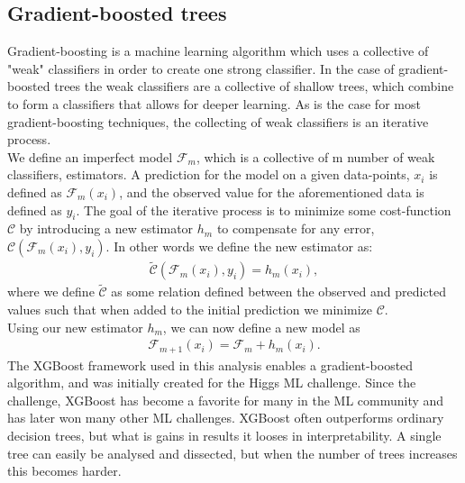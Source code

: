 \documentclass{article}
\begin{document}
\subsection{Gradient-boosted trees \cite{HIGGS}}
Gradient-boosting is a machine learning algorithm which uses a collective of "weak" classifiers in order to create one strong classifier. In the case of gradient-boosted trees the weak classifiers are a collective of shallow trees, which combine to form a classifiers that allows for deeper learning. As is the case for most gradient-boosting techniques, the collecting of weak classifiers is an iterative process.
\\
We define an imperfect model $\mathcal{F}_m$, which is a collective of m number of weak classifiers, estimators. A prediction for the model on a given data-points, $x_i$ is defined as $\mathcal{F}_m(x_i)$, and the observed value for the aforementioned data is defined as $y_i$. The goal of the iterative process is to minimize some cost-function $\mathcal{C}$ by introducing a new estimator $h_m$ to compensate for any error, $\mathcal{C}(\mathcal{F}_m(x_i), y_i)$. In other words we define the new estimator as:
\begin{align}
    \tilde{\mathcal{C}}(\mathcal{F}_m(x_i), y_i) = h_m(x_i),
\end{align}
where we define $\tilde{\mathcal{C}}$ as some relation defined between the observed and predicted values such that when added to the initial prediction we minimize $\mathcal{C}$.
\\
Using our new estimator $h_m$, we can now define a new model as
\begin{align}
    \mathcal{F}_{m+1}(x_i) = \mathcal{F}_m + h_m (x_i).
\end{align}
The XGBoost \cite{XGB} framework used in this analysis enables a gradient-boosted algorithm, and was initially created for the Higgs ML challenge. Since the challenge, XGBoost has become a favorite for many in the ML community and has later won many other ML challenges. XGBoost often outperforms ordinary decision trees, but what is gains in results it looses in interpretability. A single tree can easily be analysed and dissected, but when the number of trees increases this becomes harder. 
\end{document}
